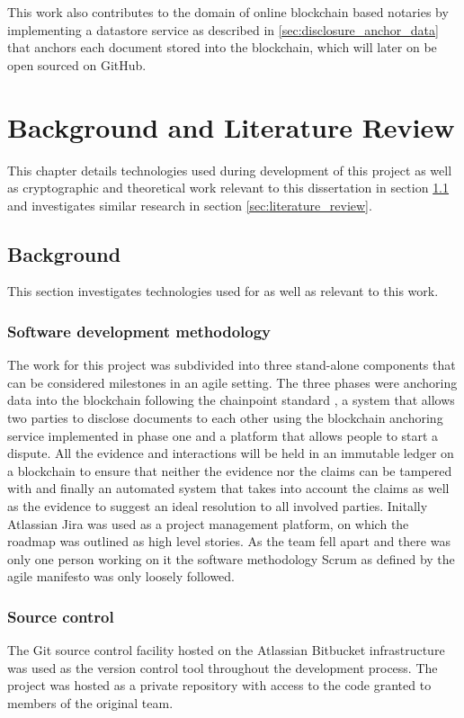 \documentclass[12pt,msc,a4paper,oneside]{ucl_thesis}
\begin{document}
This work also contributes to the domain of online blockchain based notaries by implementing a datastore service as described in \ref{sec:disclosure_anchor_data} that anchors each document stored into the blockchain, which will later on be open sourced on GitHub.

\chapter{Background and Literature Review}
\label{chapter:background_and_literature}
This chapter details technologies used during development of this project as well as cryptographic and theoretical work relevant to this dissertation in section \ref{sec:background} and investigates similar research in section \ref{sec:literature_review}.

\section{Background} \label{sec:background}
This section investigates technologies used for as well as relevant to this work.

\subsection{Software development methodology}
The work for this project was subdivided into three stand-alone components that can be considered milestones in an agile setting. The three phases were anchoring data into the blockchain following the chainpoint standard \cite{chainpoint:vaughan}, a system that allows two parties to disclose documents to each other using the blockchain anchoring service implemented in phase one and a platform that allows people to start a dispute. All the evidence and interactions will be held in an immutable ledger on a blockchain to ensure that neither the evidence nor the claims can be tampered with and finally an automated system that takes into account the claims as well as the evidence to suggest an ideal resolution to all involved parties. 
Initally Atlassian Jira was used as a project management platform, on which the roadmap was outlined as high level stories. As the team fell apart and there was only one person working on it the software methodology Scrum as defined by the agile manifesto was only loosely followed. 

\subsection{Source control}
The Git source control facility hosted on the Atlassian Bitbucket infrastructure was used as the version control tool throughout the development process. The project was hosted as a private repository with access to the code granted to members of the original team.
\end{document}
